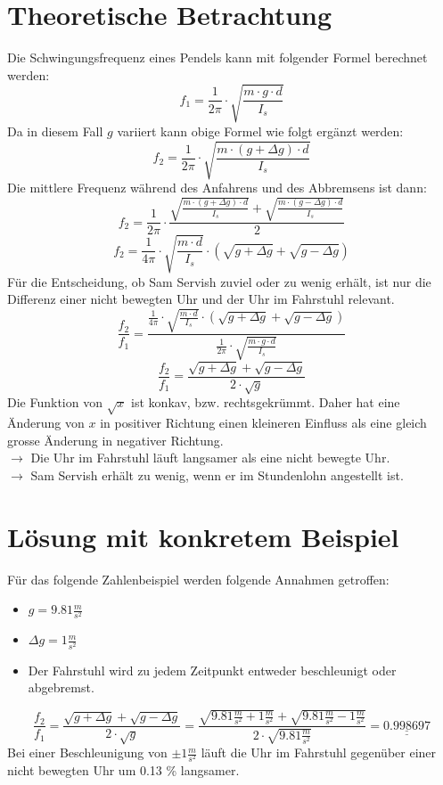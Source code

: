 \documentclass[10pt, fleqn]{article}
\begin{document}
\section{Theoretische Betrachtung}
Die Schwingungsfrequenz eines Pendels kann mit folgender Formel berechnet 
werden: 
\[ f_1 = \frac{1}{2 \pi} \cdot \sqrt{\frac{m \cdot g \cdot d}{I_s}} \]
Da in diesem Fall $g$ variiert kann obige Formel wie folgt ergänzt werden: 
\[ f_2 
= \frac{1}{2 \pi} \cdot \sqrt{\frac{m \cdot (g + \Delta g) \cdot d}{I_s}} \]
Die mittlere Frequenz während des Anfahrens und des Abbremsens ist dann: 
\[ f_2 
= \frac{1}{2 \pi} \cdot \frac{\sqrt{\frac{m \cdot (g + \Delta g) \cdot d}{I_s}} 
+ \sqrt{\frac{m \cdot (g - \Delta g) \cdot d}{I_s}}}{2} \]
\[ f_2 
= \frac{1}{4 \pi} \cdot \sqrt{\frac{m \cdot d}{I_s}} \cdot 
\left(\sqrt{g + \Delta g} + \sqrt{g - \Delta g}\right) \]
Für die Entscheidung, ob Sam Servish zuviel oder zu wenig erhält, ist nur die 
Differenz einer nicht bewegten Uhr und der Uhr im Fahrstuhl relevant. 
\[ \frac{f_2}{f_1} 
= \frac{\frac{1}{4 \pi} \cdot \sqrt{\frac{m \cdot d}{I_s}} \cdot 
\left(\sqrt{g + \Delta g} + \sqrt{g - \Delta g}\right)}
{\frac{1}{2 \pi} \cdot \sqrt{\frac{m \cdot g \cdot d}{I_s}}} \]
\[ \frac{f_2}{f_1} = \frac{\sqrt{g + \Delta g} + \sqrt{g - \Delta g}}
{2 \cdot \sqrt{g}} \]
Die Funktion von $\sqrt{x}$ ist konkav, bzw. rechtsgekrümmt. Daher hat eine
Änderung von $x$ in positiver Richtung einen kleineren Einfluss als eine gleich 
grosse Änderung in negativer Richtung. \\
$\rightarrow$ Die Uhr im Fahrstuhl läuft langsamer als eine nicht bewegte Uhr.\\
$\rightarrow$ Sam Servish erhält zu wenig, wenn er im Stundenlohn angestellt 
ist. 

\section{Lösung mit konkretem Beispiel}
Für das folgende Zahlenbeispiel werden folgende Annahmen getroffen: 
\begin{itemize}
  \item $g = 9.81 \frac{m}{s^2}$ 
  \item $\Delta g = 1 \frac{m}{s^2}$ 
  \item Der Fahrstuhl wird zu jedem Zeitpunkt entweder beschleunigt oder 
        abgebremst. 
\end{itemize}
\[ \frac{f_2}{f_1} = \frac{\sqrt{g + \Delta g} + \sqrt{g - \Delta g}}
{2 \cdot \sqrt{g}} = \frac{\sqrt{9.81\frac{m}{s^2} + 1 \frac{m}{s^2}} 
+ \sqrt{9.81\frac{m}{s^2} - 1 \frac{m}{s^2}}}
{2 \cdot \sqrt{9.81 \frac{m}{s^2}}} = \underline{\underline{0.998697}} \]
Bei einer Beschleunigung von $\pm 1 \frac{m}{s^2}$ läuft die Uhr im Fahrstuhl 
gegenüber einer nicht bewegten Uhr um 0.13 \% langsamer. 
\end{document}
